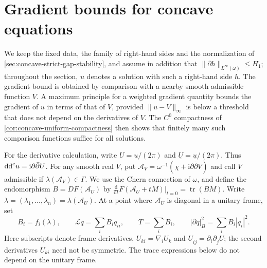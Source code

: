 \section{Gradient bounds for concave equations}
\label{sec:concave-gradient}

We keep the fixed data, the family of right-hand sides and the normalization of \cref{sec:concave-strict-gap-stability}, and assume in addition that $\|\partial h\|_{L^\infty(\omega)}\leq H_1$; throughout the section, $u$ denotes a solution with such a right-hand side $h$. The gradient bound is obtained by comparison with a nearby smooth admissible function $V$. A maximum principle for a weighted gradient quantity bounds the gradient of $u$ in terms of that of $V$, provided $\|u-V\|_\infty$ is below a threshold that does not depend on the derivatives of $V$. The $C^0$ compactness of \cref{cor:concave-uniform-compactness} then shows that finitely many such comparison functions suffice for all solutions.

For the derivative calculation, write $U=u/(2\pi)$ and $\underline U=\underline u/(2\pi)$. Thus $\mathrm{dd}^{\mathrm{c}} u=\mathrm i\partial\bar\partial U$. For any smooth real $V$, put $\mathcal A_V=\omega^{-1}(\chi+\mathrm i\partial\bar\partial V)$ and call $V$ admissible if $\lambda(\mathcal A_V)\in\Gamma$. We use the Chern connection of $\omega$, and define the endomorphism $B=DF(\mathcal A_U)$ by $\frac{\mathrm d}{\mathrm dt}F(\mathcal A_U+tM)|_{t=0}=\operatorname{tr}(BM)$. Write $\lambda=(\lambda_1,\ldots,\lambda_n)=\lambda(\mathcal A_U)$. At a point where $\mathcal A_U$ is diagonal in a unitary frame, set
\[
 B_i=f_i(\lambda),\qquad
 \mathcal Lq=\sum_iB_iq_{i\bar i},\qquad T=\sum_iB_i,
 \qquad |\partial q|_B^2=\sum_iB_i|q_i|^2.
\]
Here subscripts denote frame derivatives, $U_{ki}=\nabla_iU_k$ and $U_{i\bar j}=\partial_i\partial_{\bar j}U$; the second derivatives $U_{ki}$ need not be symmetric. The trace expressions below do not depend on the unitary frame.

